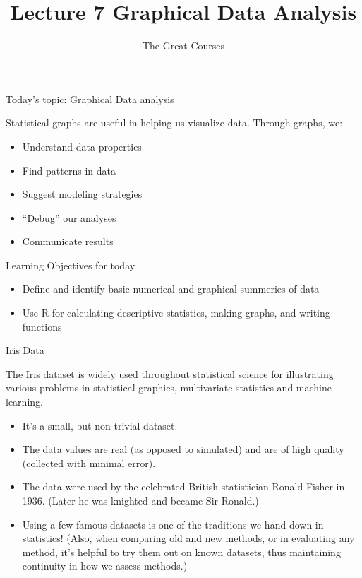 \documentclass[ignorenonframetext,]{beamer}
\title{Lecture 7 Graphical Data Analysis}
\author{The Great Courses}
\date{}
\providecommand{\tightlist}{%
\setlength{\itemsep}{0pt}\setlength{\parskip}{0pt}}
\begin{document}
\frame{\titlepage}

\begin{frame}{Today's topic: Graphical Data analysis}

Statistical graphs are useful in helping us visualize data. Through
graphs, we:

\begin{itemize}
\tightlist
\item
  Understand data properties
\item
  Find patterns in data
\item
  Suggest modeling strategies
\item
  ``Debug'' our analyses
\item
  Communicate results
\end{itemize}

\end{frame}

\begin{frame}{Learning Objectives for today}

\begin{itemize}
\item
  Define and identify basic numerical and graphical summeries of data
\item
  Use R for calculating descriptive statistics, making graphs, and
  writing functions
\end{itemize}

\end{frame}

\begin{frame}{Iris Data}

The Iris dataset is widely used throughout statistical science for
illustrating various problems in statistical graphics, multivariate
statistics and machine learning.

\begin{itemize}
\item
  It's a small, but non-trivial dataset.
\item
  The data values are real (as opposed to simulated) and are of high
  quality (collected with minimal error).
\item
  The data were used by the celebrated British statistician Ronald
  Fisher in 1936. (Later he was knighted and became Sir Ronald.)
\item
  Using a few famous datasets is one of the traditions we hand down in
  statistics! (Also, when comparing old and new methods, or in
  evaluating any method, it's helpful to try them out on known datasets,
  thus maintaining continuity in how we assess methods.)
\end{itemize}

\end{frame}
\end{document}
